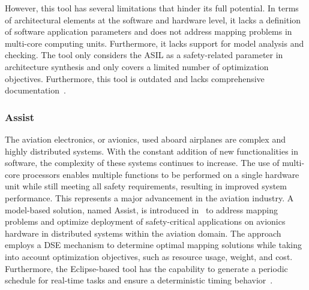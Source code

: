 However, this tool has several limitations that hinder its full potential. In terms of architectural elements at the software and hardware level, it lacks a definition of software application parameters and does not address mapping problems in multi-core computing units. Furthermore, it lacks support for model analysis and checking. The tool only considers the ASIL as a safety-related parameter in architecture synthesis and only covers a limited number of optimization objectives. Furthermore, this tool is outdated and lacks comprehensive documentation~\cite{askaripoor2022architecture}.



\subsubsection{Assist}
The aviation electronics, or avionics, used aboard airplanes are complex and highly distributed systems. With the constant addition of new functionalities in software, the complexity of these systems continues to increase. The use of multi-core processors enables multiple functions to be performed on a single hardware unit while still meeting all safety requirements, resulting in improved system performance. This represents a major advancement in the aviation industry.
A model-based solution, named Assist, is introduced in~\cite{hilbrich2013deploying} to address mapping problems and optimize deployment of safety-critical applications on avionics hardware in distributed systems within the aviation domain. The approach employs a DSE mechanism to determine optimal mapping solutions while taking into account optimization objectives, such as resource usage, weight, and cost. Furthermore, the Eclipse-based tool has the capability to generate a periodic schedule for real-time tasks and ensure a deterministic timing behavior~\cite{hilbrich2017experiences}.

